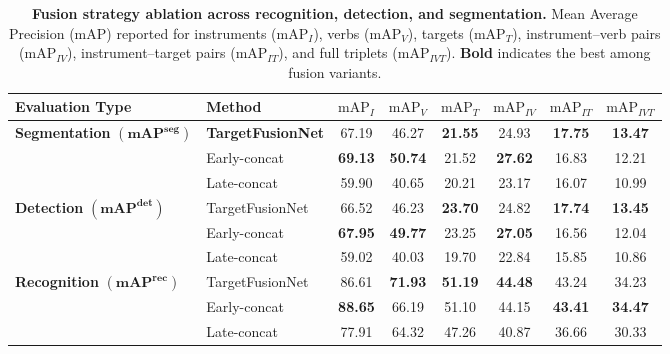 \documentclass[11pt]{article}
\newcommand{\mAP}{\textrm{mAP}}
\begin{document}
\begin{table}[t]
\centering
\caption{\textbf{Fusion strategy ablation across recognition, detection, and segmentation.}
Mean Average Precision ($\mAP$) reported for instruments ($\mAP_I$), verbs ($\mAP_V$), targets ($\mAP_T$), instrument–verb pairs ($\mAP_{IV}$), instrument–target pairs ($\mAP_{IT}$), and full triplets ($\mAP_{IVT}$). 
\textbf{Bold} indicates the best among fusion variants.}
\label{tab:fusion_strategy_appendix}
\begin{tabular}{llcccccc}
\toprule
\textbf{Evaluation Type} & \textbf{Method} & $\mAP_I$ & $\mAP_V$ & $\mAP_T$ & $\mAP_{IV}$ & $\mAP_{IT}$ & $\mAP_{IVT}$ \\
\midrule
\multirow{3}{*}{\textbf{Segmentation} $\bm{(\mAP^{seg})}$}
& \textbf{TargetFusionNet }& 67.19 & 46.27 & \textbf{21.55} & 24.93 & \textbf{17.75} & \textbf{13.47} \\
& Early-concat             & \textbf{69.13} & \textbf{50.74} & 21.52 & \textbf{27.62} & 16.83 & 12.21 \\
& Late-concat              & 59.90 & 40.65 & 20.21 & 23.17 & 16.07 & 10.99 \\
\midrule
\multirow{3}{*}{\textbf{Detection} $\bm{(\mAP^{det})}$}
& TargetFusionNet & 66.52 & 46.23 & \textbf{23.70} & 24.82 & \textbf{17.74} & \textbf{13.45} \\
& Early-concat             & \textbf{67.95} & \textbf{49.77} & 23.25 & \textbf{27.05} & 16.56 & 12.04 \\
& Late-concat              & 59.02 & 40.03 & 19.70 & 22.84 & 15.85 & 10.86 \\
\midrule
\multirow{3}{*}{\textbf{Recognition} $\bm{(\mAP^{rec})}$}
& TargetFusionNet & 86.61 & \textbf{71.93} & \textbf{51.19} & \textbf{44.48} & 43.24 & 34.23 \\
& Early-concat             & \textbf{88.65} & 66.19 & 51.10 & 44.15 & \textbf{43.41} & \textbf{34.47} \\
& Late-concat              & 77.91 & 64.32 & 47.26 & 40.87 & 36.66 & 30.33 \\
\bottomrule
\end{tabular}
\end{table}
\end{document}

